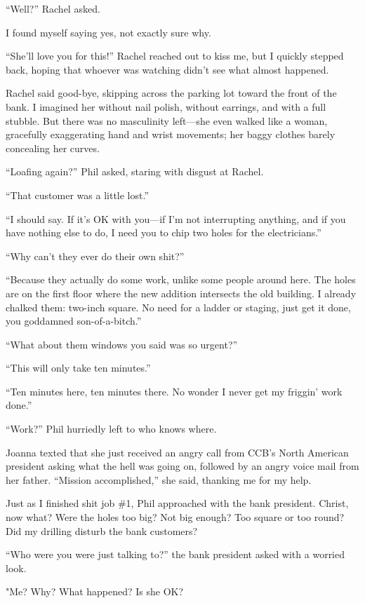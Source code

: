 ``Well?'' Rachel asked.

I found myself saying yes, not exactly sure why.

``She'll love you for this!'' Rachel reached out to kiss me, but I
quickly stepped back, hoping that whoever was watching didn't see what
almost happened.

Rachel said good-bye, skipping across the parking lot toward the front
of the bank. I imagined her without nail polish, without earrings, and
with a full stubble. But there was no masculinity left---she even walked
like a woman, gracefully exaggerating hand and wrist movements; her
baggy clothes barely concealing her curves.

``Loafing again?'' Phil asked, staring with disgust at Rachel.

``That customer was a little lost.''

``I should say. If it's OK with you---if I'm not interrupting anything,
and if you have nothing else to do, I need you to chip two holes for the
electricians.''

``Why can't they ever do their own shit?''

``Because they actually do some work, unlike some people around here.
The holes are on the first floor where the new addition intersects the
old building. I already chalked them: two-inch square. No need for a
ladder or staging, just get it done, you goddamned son-of-a-bitch.''

``What about them windows you said was so urgent?''

``This will only take ten minutes.''

``Ten minutes here, ten minutes there. No wonder I never get my friggin'
work done.''

``Work?'' Phil hurriedly left to who knows where.

Joanna texted that she just received an angry call from CCB's North
American president asking what the hell was going on, followed by an
angry voice mail from her father. ``Mission accomplished,'' she said,
thanking me for my help.

Just as I finished shit job \#1, Phil approached with the bank
president. Christ, now what? Were the holes too big? Not big enough? Too
square or too round? Did my drilling disturb the bank customers?

``Who were you were just talking to?'' the bank president asked with a
worried look.

"Me? Why? What happened? Is she OK?

